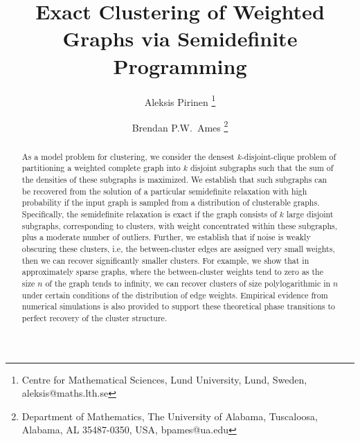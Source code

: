 \documentclass[twoside,11pt]{article}
\newcommand{\0}{\bs{0}}
\begin{document}
\title{Exact Clustering of Weighted Graphs via Semidefinite Programming}
\author{Aleksis Pirinen \thanks{Centre for Mathematical Sciences, Lund University, Lund, Sweden, aleksis@maths.lth.se  }
	\and
	 Brendan P.W.~Ames
	\thanks{ Department of Mathematics,
	The University of Alabama,
	Tuscaloosa, Alabama, AL 35487-0350, USA, bpames@ua.edu}
}

\maketitle
\begin{abstract}%
As a model problem for clustering, we consider the densest $k$-disjoint-clique problem of partitioning a weighted complete
graph into
$k$ disjoint subgraphs such that the sum of the densities of these subgraphs is maximized.
We establish that such subgraphs can be recovered from the solution of a particular
semidefinite relaxation with high probability if the input graph is sampled from a distribution of clusterable graphs.
Specifically, the semidefinite relaxation is exact if the graph
consists of \(k\) large disjoint subgraphs, corresponding to clusters, with weight concentrated within these subgraphs,
plus a moderate number of outliers.
Further, we establish that if noise is weakly obscuring these clusters, i.e, the between-cluster edges are assigned
very small weights,
then we can recover significantly smaller clusters.
For example, we show that in approximately sparse graphs, where the between-cluster weights tend to zero as the size $n$ of the graph tends to infinity, we can recover clusters of size polylogarithmic in $n$
under certain conditions of the distribution of edge weights.
Empirical evidence from
numerical simulations is also provided to support these theoretical phase transitions to perfect recovery of the cluster structure.
\end{abstract}

\end{document}
